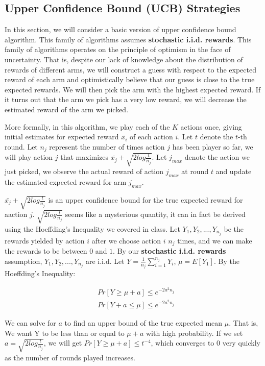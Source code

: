 \documentclass[12pt]{article}
\begin{document}
\subsection{Upper Confidence Bound (UCB) Strategies}

In this section, we will consider a basic version of upper confidence bound algorithm\cite{UCB}. This family of algorithms assumes \textbf{stochastic i.i.d. rewards}. This family of algorithms operates on the principle of optimism in the face of uncertainty. That is, despite our lack of knowledge about the distribution of rewards of different arms, we will construct a guess with respect to the expected reward of each arm and optimistically believe that our guess is close to the true expected rewards. We will then pick the arm with the highest expected reward. If it turns out that the arm we pick has a very low reward, we will decrease the estimated reward of the arm we picked.

More formally, in this algorithm, we play each of the $K$ actions once, giving initial estimates for expected reward $\bar{x_i}$ of each action $i$. Let $t$ denote the $t$-th round. Let $n_j$ represent the number of times action $j$ has been player so far, we will play action $j$ that maximizes $\bar{x_j} + \sqrt{2log\frac{t}{n_j}}$. Let $j_{max}$ denote the action we just picked, we observe the actual reward of action $j_{max}$ at round $t$ and update the estimated expected reward for arm $j_{max}$.

$\bar{x_j} + \sqrt{2log\frac{t}{n_j}}$ is an upper confidence bound for the true expected reward for aaction $j$. $\sqrt{2log\frac{t}{n_j}}$ seems like a mysterious quantity, it can in fact be derived using the Hoeffding’s Inequality we covered in class. Let $Y_1,Y_2,...,Y_{n_j}$ be the rewards yielded by action $i$ after we choose action $i$ $n_j$ times, and we can make the rewards to be between $0$ and $1$. By our \textbf{stochastic i.i.d. rewards} assumption,  $Y_1,Y_2,...,Y_{n_j}$ are i.i.d. Let $Y = \frac{1}{n_j}\sum_{i = 1}^{n_j}Y_i$, $\mu = E[Y_1]$. By the Hoeffding’s Inequality:

\begin{equation} 
	\begin{split}
	    & Pr[Y \geq \mu + a] \leq e^{-2a^2 n_j} \\
		& Pr[Y + a \leq \mu ] \leq e^{-2a^2 n_j}
	\end{split}
\end{equation}

We can solve for $a$ to find an upper bound of the true expected mean $\mu$. That is, We want  Y to be less than or equal to $\mu + a$ with high probability. If we set $a = \sqrt{2log\frac{t}{n_j}}$, we will get $Pr[Y \geq \mu + a] \leq t^{-4}$, which converges to $0$ very quickly as the number of rounds played increases. 
\end{document}
